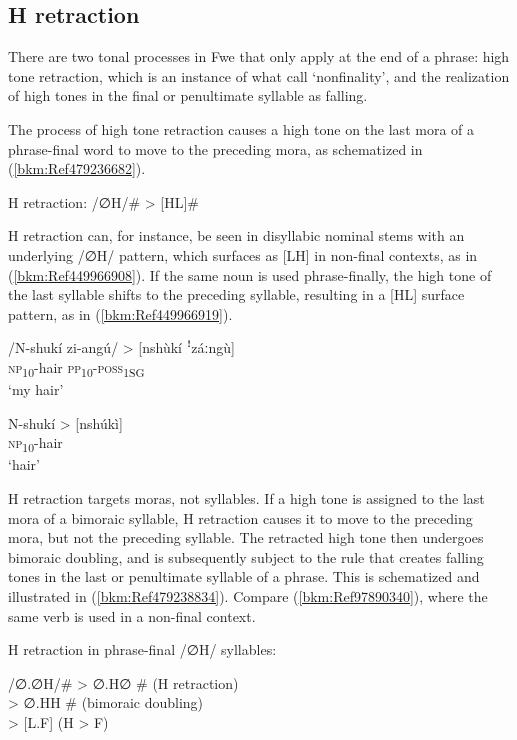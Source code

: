 \subsection{H retraction}
\label{bkm:Ref486506264}\hypertarget{Toc75352621}{}
There are two tonal processes in Fwe that only apply at the end of a phrase: high tone retraction, which is an instance of what {\citet[9-10]{OddenMarlo2019}} call ‘nonfinality’, and the realization of high tones in the final or penultimate syllable as falling.

The process of high tone retraction causes a high tone on the last mora of a phrase-final word to move to the preceding mora, as schematized in (\ref{bkm:Ref479236682}).

\ea
\label{bkm:Ref479236682}
H retraction: /∅H/\# > [HL]\#
\z

H retraction can, for instance, be seen in disyllabic nominal stems with an un\-derlying /∅H/ pattern, which surfaces as [LH] in non-final contexts, as in (\ref{bkm:Ref449966908}). If the same noun is used phrase-finally, the high tone of the last syllable shifts to the preceding syllable, result\-ing in a [HL] surface pattern, as in (\ref{bkm:Ref449966919}).

\ea
\label{bkm:Ref449966908}
\gll /N-shukí   zi-angú/ > [nshùkí ꜝzáːngù]\\
\textsc{np}\textsubscript{10}-hair  \textsc{pp}\textsubscript{10}-\textsc{poss}\textsubscript{1SG}\\
\glt ‘my hair’
\z

\ea
\label{bkm:Ref449966919}
\gll N-shukí > [nshúkì]\\
\textsc{np}\textsubscript{10}-hair\\
\glt ‘hair’
\z

H retraction targets moras, not syllables. If a high tone is assigned to the last mora of a bimoraic syllable, H retraction causes it to move to the preceding mora, but not the preceding syllable. The retracted high tone then undergoes bimoraic doubling, and is subsequently subject to the rule that creates falling tones in the last or penultimate syllable of a phrase. This is schematized and illustrated in (\ref{bkm:Ref479238834}). Compare (\ref{bkm:Ref97890340}), where the same verb is used in a non-final context.

\ea
\label{bkm:Ref479238834}
  H retraction in phrase-final /∅H/ syllables:

\ea
/∅.∅H/\# > ∅.H∅ \# (H retraction) \\
> ∅.HH \# (bimoraic doubling) \\
> [L.F] (H > F)

